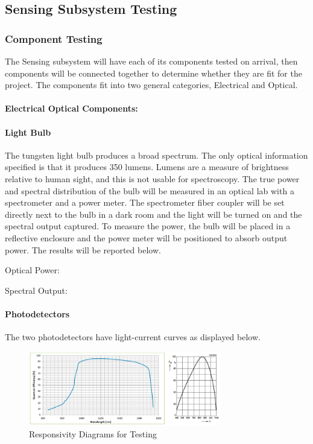 \subsection{Sensing Subsystem Testing}
\label{sec:sensing_subsystem_testing}

\subsubsection{Component Testing}

The Sensing subsystem will have each of its components tested on arrival, then components will be connected together to determine whether they are fit for the project. The components fit into two general categories, Electrical and Optical.

\paragraph{Electrical Optical Components:} 

\paragraph{Light Bulb} The tungsten light bulb produces a broad spectrum. The only optical information specified is that it produces 350 lumens. Lumens are a measure of brightness relative to human sight, and this is not usable for spectroscopy. The true power and spectral distribution of the bulb will be measured in an optical lab with a spectrometer and a power meter. The spectrometer fiber coupler will be set directly next to the bulb in a dark room and the light will be turned on and the spectral output captured. To measure the power, the bulb will be placed in a reflective enclosure and the power meter will be positioned to absorb output power. The results will be reported below.
\bigskip

Optical Power:

Spectral Output:

\paragraph{Photodetectors} The two photodetectors have light-current curves as displayed below.

\begin{figure}[H]
    \caption{Responsivity Diagrams for Testing}
    \centering
    \includegraphics[width=0.75\textwidth]{images/ResponsivityCurves.png}
\end{figure}

